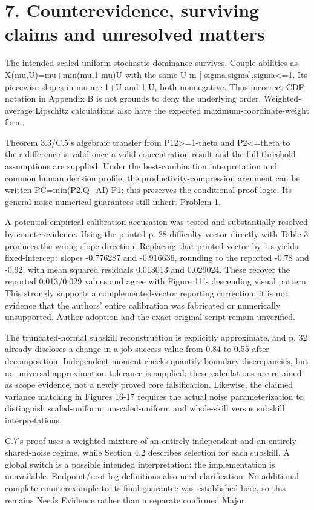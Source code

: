 \documentclass[10pt]{article}
\begin{document}
\section*{7. Counterevidence, surviving claims and unresolved matters}
The intended scaled-uniform stochastic dominance survives. Couple abilities as X(mu,U)=mu+min(mu,1-mu)U with the same U in [-sigma,sigma],sigma<=1. Its piecewise slopes in mu are 1+U and 1-U, both nonnegative. Thus incorrect CDF notation in Appendix B is not grounds to deny the underlying order. Weighted-average Lipschitz calculations also have the expected maximum-coordinate-weight form.\par
Theorem 3.3/C.5’s algebraic transfer from P12>=1-theta and P2<=theta to their difference is valid once a valid concentration result and the full threshold assumptions are supplied. Under the best-combination interpretation and common human decision profile, the productivity-compression argument can be written PC=min(P2,Q\_AI)-P1; this preserves the conditional proof logic. Its general-noise numerical guarantees still inherit Problem 1.\par
A potential empirical calibration accusation was tested and substantially resolved by counterevidence. Using the printed p. 28 difficulty vector directly with Table 3 produces the wrong slope direction. Replacing that printed vector by 1-s yields fixed-intercept slopes -0.776287 and -0.916636, rounding to the reported -0.78 and -0.92, with mean squared residuals 0.013013 and 0.029024. These recover the reported 0.013/0.029 values and agree with Figure 11’s descending visual pattern. This strongly supports a complemented-vector reporting correction; it is not evidence that the authors’ entire calibration was fabricated or numerically unsupported. Author adoption and the exact original script remain unverified.\par
The truncated-normal subskill reconstruction is explicitly approximate, and p. 32 already discloses a change in a job-success value from 0.84 to 0.55 after decomposition. Independent moment checks quantify boundary discrepancies, but no universal approximation tolerance is supplied; these calculations are retained as scope evidence, not a newly proved core falsification. Likewise, the claimed variance matching in Figures 16-17 requires the actual noise parameterization to distinguish scaled-uniform, unscaled-uniform and whole-skill versus subskill interpretations.\par
C.7’s proof uses a weighted mixture of an entirely independent and an entirely shared-noise regime, while Section 4.2 describes selection for each subskill. A global switch is a possible intended interpretation; the implementation is unavailable. Endpoint/root-log definitions also need clarification. No additional complete counterexample to its final guarantee was established here, so this remains Needs Evidence rather than a separate confirmed Major.\par
\end{document}
